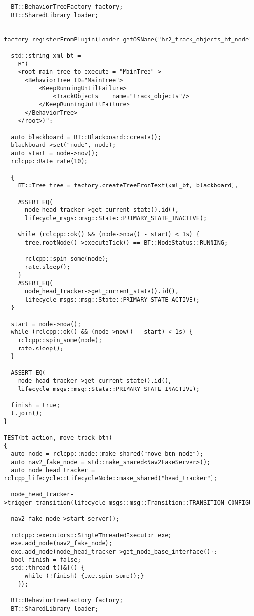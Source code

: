 \begin{tcolorbox}[sharp corners, colframe=gray!80, colback=LightGray, left=0pt, top=0pt, bottom=0pt, title=\texttt{br2\_bt\_patrolling/tests/bt\_action\_test.cpp}]
\begin{verbatim}
  BT::BehaviorTreeFactory factory;
  BT::SharedLibrary loader;

  factory.registerFromPlugin(loader.getOSName("br2_track_objects_bt_node"));

  std::string xml_bt =
    R"(
    <root main_tree_to_execute = "MainTree" >
      <BehaviorTree ID="MainTree">
          <KeepRunningUntilFailure>
              <TrackObjects    name="track_objects"/>
          </KeepRunningUntilFailure>
      </BehaviorTree>
    </root>)";

  auto blackboard = BT::Blackboard::create();
  blackboard->set("node", node);
  auto start = node->now();
  rclcpp::Rate rate(10);

  {
    BT::Tree tree = factory.createTreeFromText(xml_bt, blackboard);

    ASSERT_EQ(
      node_head_tracker->get_current_state().id(),
      lifecycle_msgs::msg::State::PRIMARY_STATE_INACTIVE);

    while (rclcpp::ok() && (node->now() - start) < 1s) {
      tree.rootNode()->executeTick() == BT::NodeStatus::RUNNING;

      rclcpp::spin_some(node);
      rate.sleep();
    }
    ASSERT_EQ(
      node_head_tracker->get_current_state().id(),
      lifecycle_msgs::msg::State::PRIMARY_STATE_ACTIVE);
  }

  start = node->now();
  while (rclcpp::ok() && (node->now() - start) < 1s) {
    rclcpp::spin_some(node);
    rate.sleep();
  }

  ASSERT_EQ(
    node_head_tracker->get_current_state().id(),
    lifecycle_msgs::msg::State::PRIMARY_STATE_INACTIVE);

  finish = true;
  t.join();
}

TEST(bt_action, move_track_btn)
{
  auto node = rclcpp::Node::make_shared("move_btn_node");
  auto nav2_fake_node = std::make_shared<Nav2FakeServer>();
  auto node_head_tracker = rclcpp_lifecycle::LifecycleNode::make_shared("head_tracker");

  node_head_tracker->trigger_transition(lifecycle_msgs::msg::Transition::TRANSITION_CONFIGURE);

  nav2_fake_node->start_server();

  rclcpp::executors::SingleThreadedExecutor exe;
  exe.add_node(nav2_fake_node);
  exe.add_node(node_head_tracker->get_node_base_interface());
  bool finish = false;
  std::thread t([&]() {
      while (!finish) {exe.spin_some();}
    });

  BT::BehaviorTreeFactory factory;
  BT::SharedLibrary loader;


\end{verbatim}
\end{tcolorbox}
